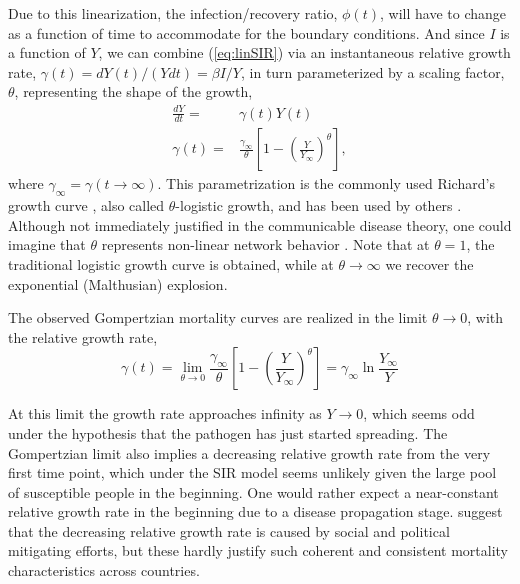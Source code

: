 \documentclass{article}
\begin{document}
 Due to this linearization, the infection/recovery ratio, $\phi(t)$, will have to change as a function of time to accommodate for the boundary conditions. And since $I$ is a function of $Y$, we can combine (\ref{eq:linSIR}) via an instantaneous relative growth rate, $\gamma(t) = dY(t) /(Ydt) = \beta I / Y$, in turn parameterized by a scaling factor, $\theta$, representing the shape of the growth,
\begin{subequations}
\label{eq:rypdal}
\begin{align}
\frac{dY}{dt} =& \gamma(t) Y(t) \label{eq:rypdalODE}\\
\gamma(t) =& \frac{\gamma_{\infty}}{\theta}\left[1 - \left(\frac{Y}{Y_{\infty}}\right)^{\theta} \right] \label{eq:rypdalGamma},
\end{align}
\end{subequations}
where $\gamma_{\infty} = \gamma(t\rightarrow \infty)$. This parametrization is the commonly used Richard's growth curve \citep{richards1959flexible}, also called $\theta$-logistic growth, and has been used by others \citep{wu2020generalized}. Although not immediately justified in the communicable disease theory, one could imagine that $\theta$ represents non-linear network behavior \citep{petroni2020logistic}. Note that at $\theta=1$, the traditional logistic growth curve is obtained, while at $\theta\rightarrow \infty$ we recover the exponential (Malthusian) explosion.

The observed Gompertzian mortality curves are realized in the limit $\theta \rightarrow 0$, with the relative growth rate, 
\begin{equation}
\label{eq:rypdalLimit}
\gamma(t) = \lim_{\theta \rightarrow 0}\frac{\gamma_{\infty}}{\theta}\left[1 - \left(\frac{Y}{Y_{\infty}}\right)^{\theta} \right]
= \gamma_{\infty}\ln{\frac{Y_{\infty}}{Y}}
\end{equation}

 At this limit the growth rate approaches infinity as $Y \rightarrow 0$, which seems odd under the hypothesis that the pathogen has just started spreading. 
 The Gompertzian limit also implies a decreasing relative growth rate from the very first time point, which under the SIR model seems unlikely given the large pool of susceptible people in the beginning. 
 One would rather expect a near-constant relative growth rate in the beginning due to a disease propagation stage. 
 \citet{Rypdal2020} suggest that the decreasing relative growth rate is caused by social and political mitigating efforts, but these hardly justify such coherent and consistent mortality characteristics across countries. 
 
\end{document}
